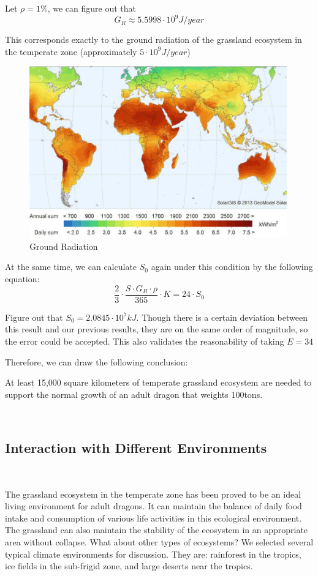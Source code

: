 \documentclass{mcmthesis}
\begin{document}
Let $\rho=1\%$, we can figure out that
\begin{equation}
    G_{R}\approx 5.5998\cdot 10^{9} J/year
\end{equation}

This corresponds exactly to the ground radiation of the grassland ecosystem in the temperate zone (approximately $5\cdot 10^{9} J/year$)

\begin{figure}[!htbp]
    \centering
    \includegraphics[width=30em]{Solar_radiation.png}
    \caption{Ground Radiation}
\end{figure}

At the same time, we can calculate $S_{0}$ again under this condition by the following equation:
\begin{equation}
    \frac{2}{3}\cdot \frac{S\cdot G_{R}\cdot \rho}{365}\cdot K = 24 \cdot S_{0}
\end{equation}

Figure out that $S_{0}=2.0845\cdot 10^{7}kJ$.
Though there is a certain deviation between this result and our previous results, they are on the same order of magnitude, so the error could be accepted.
This also validates the reasonability of taking $E=34$

Therefore, we can draw the following conclusion:

At least 15,000 square kilometers of temperate grassland ecosystem are needed to support the normal growth of an adult dragon that weights 100tons.


~\ \
\subsection{Interaction with Different Environments}
~\ \

The grassland ecosystem in the temperate zone has been proved to be an ideal living environment for adult dragons. It can maintain the balance of daily food intake and consumption of various life activities in this ecological environment. The grassland can also maintain the stability of the ecosystem in an appropriate area without collapse. What about other types of ecosystems? We selected several typical climate environments for discussion. They are: rainforest in the tropics, ice fields in the sub-frigid zone, and large deserts near the tropics.
\end{document}
